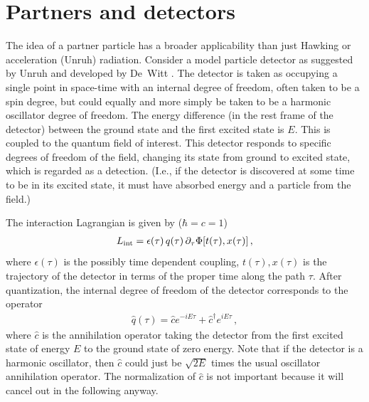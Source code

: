 \documentclass[aps,prd,showpacs,amssymb,nofootinbib,twocolumn]{revtex4}
\newcommand{\bea}{\begin{eqnarray}}
\newcommand{\eea}{\end{eqnarray}}
\begin{document}
\section{Partners and detectors}\label{Partners and detectors}

The idea of a partner particle has a broader applicability than just Hawking 
or acceleration (Unruh) radiation. 
%
Consider a model particle detector as suggested by Unruh \cite{unruh} and 
developed by De~Witt \cite{dewitt}. 
%
The detector is taken as occupying a single point in space-time with an 
internal degree of freedom, often taken to be a spin degree, 
but could equally and more simply be taken to be a harmonic oscillator 
degree of freedom. 
%
The energy difference (in the rest frame of the detector) between the ground 
state and the first excited state is $E$.
%
This is coupled to the quantum field of interest. 
%
This detector responds to specific degrees of freedom of the field, changing 
its state from ground to excited state, which is regarded as a detection. 
%
(I.e., if the detector is discovered at some time to be in its excited
state, it must have absorbed energy and a particle from the field.) 

The interaction Lagrangian is given by ($\hbar=c=1$) 
%
\bea
L_{\rm int}
=
\epsilon(\tau)\,q(\tau)\,\partial_\tau\Phi[t(\tau),x(\tau)]
\,,
\eea
%
where $\epsilon(\tau)$ is the possibly time dependent coupling,
$t(\tau),x(\tau)$ is the trajectory of the detector in terms of the proper
time along the path $\tau$.
%
After quantization, the internal degree of freedom of the detector 
corresponds to the operator
%
\bea
\hat q(\tau)= \hat c e^{-iE\tau} +\hat c^\dagger e^{iE\tau}
\,,
\eea
%
where $\hat c$ is the annihilation operator taking the detector from the 
first excited state of energy $E$ to the ground state of zero energy. 
%
Note that if the detector is a harmonic oscillator, then $\hat c$ could just 
be $\sqrt{2E}$ times the usual oscillator annihilation operator. 
%
The normalization of $\hat c$ is not important because it will cancel out in 
the following anyway.
\end{document}
